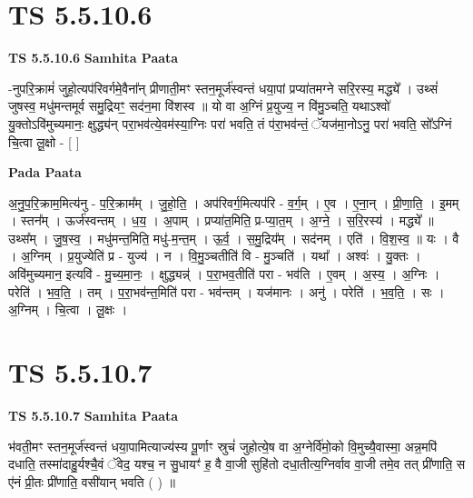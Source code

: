 \documentclass[17pt]{extarticle}
\begin{document}
\section*{ TS 5.5.10.6 }

\textbf{TS 5.5.10.6 } \newline
\textbf{Samhita Paata} \newline

-नुपरि॒क्रामं॑ जुहो॒त्यप॑रिवर्गमे॒वैना᳚न् प्रीणाती॒मꣳ स्तन॒मूर्ज॑स्वन्तं धया॒पां प्रप्या॑तमग्ने सरि॒रस्य॒ मद्ध्ये᳚ । उथ्सं॑ जुषस्व॒ मधु॑मन्तमूर्व समु॒द्रियꣳ॒॒ सद॑न॒मा वि॑शस्व ॥ यो वा अ॒ग्निं प्र॒युज्य॒ न वि॑मु॒ञ्चति॒ यथाऽश्वो॑ यु॒क्तोऽवि॑मुच्यमानः॒ क्षुद्ध्य॑न् परा॒भव॑त्ये॒वम॑स्या॒ग्निः परा॑ भवति॒ तं प॑रा॒भव॑न्तं॒ ॅयज॑मा॒नोऽनु॒ परा॑ भवति॒ सो᳚ऽग्निं चि॒त्वा लू॒क्षो - [  ] \newline

\textbf{Pada Paata} \newline

अ॒नु॒प॒रि॒क्राम॒मित्य॑नु - प॒रि॒क्राम᳚म् । जु॒हो॒ति॒ । अप॑रिवर्ग॒मित्यप॑रि - व॒र्ग॒म् । ए॒व । ए॒ना॒न् । प्री॒णा॒ति॒ । इ॒मम् । स्तन᳚म् । ऊर्ज॑स्वन्तम् । ध॒य॒ । अ॒पाम् । प्रप्या॑त॒मिति॒ प्र-प्या॒त॒म् । अ॒ग्ने॒ । स॒रि॒रस्य॑ । मद्ध्ये᳚ ॥ उथ्स᳚म् । जु॒ष॒स्व॒ । मधु॑मन्त॒मिति॒ मधु॑-म॒न्त॒म् । ऊ॒र्व॒ । स॒मु॒द्रिय᳚म् । सद॑नम् । एति॑ । वि॒श॒स्व॒ ॥ यः । वै । अ॒ग्निम् । प्र॒युज्येति॑ प्र - युज्य॑ । न । वि॒मु॒ञ्चतीति॑ वि - मु॒ञ्चति॑ । यथा᳚ । अश्वः॑ । यु॒क्तः । अवि॑मुच्यमान॒ इत्यवि॑ - मु॒च्य॒मा॒नः॒ । क्षुद्ध्यन्न्॑ । प॒रा॒भव॒तीति॑ परा - भव॑ति । ए॒वम् । अ॒स्य॒ । अ॒ग्निः । परेति॑ । भ॒व॒ति॒ । तम् । प॒रा॒भव॑न्त॒मिति॑ परा - भव॑न्तम् । यज॑मानः । अनु॑ । परेति॑ । भ॒व॒ति॒ । सः । अ॒ग्निम् । चि॒त्वा । लू॒क्षः ।  \newline




\section*{ TS 5.5.10.7 }

\textbf{TS 5.5.10.7 } \newline
\textbf{Samhita Paata} \newline

भ॑वती॒मꣳ स्तन॒मूर्ज॑स्वन्तं धया॒पामित्याज्य॑स्य पू॒र्णाꣳ स्रुचं॑ जुहोत्ये॒ष वा अ॒ग्नेर्वि॑मो॒को वि॒मुच्यै॒वास्मा॒ अन्न॒मपि॑ दधाति॒ तस्मा॑दाहु॒र्यश्चै॒वं ॅवेद॒ यश्च॒ न सु॒धायꣳ॑ ह॒ वै वा॒जी सुहि॑तो दधा॒तीत्य॒ग्निर्वाव वा॒जी तमे॒व तत् प्री॑णाति॒ स ए॑नं प्री॒तः प्री॑णाति॒ वसी॑यान् भवति ( ) ॥ \newline
\end{document}
